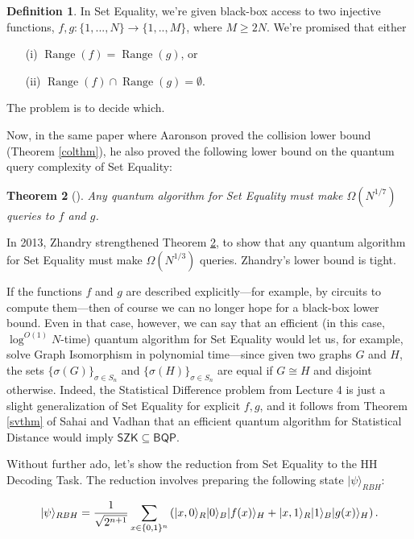 \documentclass[12pt]{report}
\theoremstyle{plain}
\newtheorem{theorem}{Theorem}[section]
\theoremstyle{definition}
\newtheorem{definition}[theorem]{Definition}
\renewcommand{\ket}[1]{|#1\rangle}
\begin{document}
\begin{definition}
In Set Equality, we're given black-box access to two injective functions,
$f,g: \{1,...,N\} \rightarrow \{1,..,M\}$, where $M \geq 2N$.
We're promised that either
\begin{enumerate}
\item[(i)] $\operatorname*{Range}(f) = \operatorname*{Range}(g)$, or
\item[(ii)] $\operatorname*{Range}(f) \cap \operatorname*{Range}(g) = \emptyset$.
\end{enumerate}
The problem is to decide which.
\end{definition}

Now, in the same paper \cite{aar:col} where Aaronson proved the collision lower bound (Theorem \ref{colthm}), he also proved the following
lower bound on the quantum query complexity of Set Equality:

\begin{theorem}[\cite{aar:col}]
\label{seteqthm}
Any quantum algorithm for Set Equality must make
$\Omega(N^{1/7})$ queries to $f$ and $g$.
\end{theorem}

In 2013, Zhandry \cite{zhandry:col} strengthened Theorem \ref{seteqthm}, to show
that any quantum algorithm for Set Equality
must make $\Omega(N^{1/3})$ queries.  Zhandry's lower bound is tight.

If the functions $f$ and $g$ are described explicitly---for example, by circuits to compute them---then
of course we can no longer hope for a black-box lower bound.  Even in that case, however, we can say
that an efficient (in this case, $\log^{O(1)} N$-time) quantum algorithm for Set Equality would let us, for example,
solve Graph Isomorphism in polynomial time---since given two graphs $G$ and $H$, the sets $\{\sigma(G)\}_{\sigma\in S_n}$ and
$\{\sigma(H)\}_{\sigma\in S_n}$ are equal if $G\cong H$ and disjoint otherwise.  Indeed, the Statistical Difference
problem from Lecture 4 is just a slight generalization of Set Equality for explicit $f,g$, and it follows from Theorem \ref{svthm}
of Sahai and Vadhan \cite{DBLP:journals/jacm/SahaiV03} that an efficient quantum algorithm for Statistical Distance
would imply $\mathsf{SZK}\subseteq \mathsf{BQP}$.

Without further ado, let's show the reduction from Set Equality to the HH Decoding Task.  The reduction involves preparing
the following state $\ket{\psi}_{RBH}$:

$$\ket{\psi}_{RBH} = {1 \over \sqrt{2^{n+1}}}
\sum_{x\in\{0,1\}^n} \left( \ket{x,0}_R \ket{0}_B \ket{f(x)}_H + \ket{x,1}_R \ket{1}_B \ket{g(x)}_H \right).
$$
\end{document}
